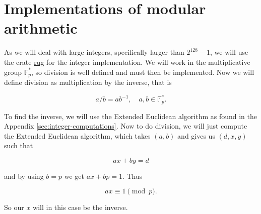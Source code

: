 \section{Implementations of modular arithmetic}

As we will deal with large integers, specifically larger than $2^{128}-1$, we will use the crate \href{https://docs.rs/rug/latest/rug/}{rug} for the integer implementation.
We will work in the multiplicative group $\mathbb{F}_p^*$, so division is well defined and must then be implemented.
Now we will define division as multiplication by the inverse, that is 

\begin{equation}
  a / b = ab^{-1}, \quad a, b \in \mathbb{F}_p^*.
  \label{eq:division}
\end{equation}

To find the inverse, we will use the Extended Euclidean algorithm as found in the Appendix \ref{sec:integer-computations}.
Now to do division, we will just compute the Extended Euclidean algorithm, which takes $(a, b)$ and gives us $(d, x, y)$ such that

\begin{equation}
  ax + by = d
  \label{eq:ext-euclid-alg}
\end{equation}

and by using $b = p$ we get $ax + bp = 1$. Thus

\begin{equation}
  ax \equiv 1 \pmod{p}.
\end{equation}

So our $x$ will in this case be the inverse.

